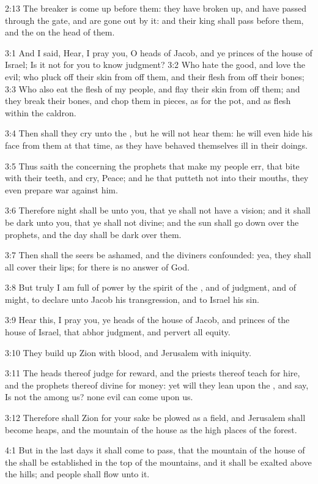 2:13 The breaker is come up before them: they have broken up, and have passed through the gate, and are gone out by it: and their king shall pass before them, and the \LORD on the head of them.

3:1 And I said, Hear, I pray you, O heads of Jacob, and ye princes of the house of Israel; Is it not for you to know judgment?  3:2 Who hate the good, and love the evil; who pluck off their skin from off them, and their flesh from off their bones; 3:3 Who also eat the flesh of my people, and flay their skin from off them; and they break their bones, and chop them in pieces, as for the pot, and as flesh within the caldron.

3:4 Then shall they cry unto the \LORD, but he will not hear them: he will even hide his face from them at that time, as they have behaved themselves ill in their doings.

3:5 Thus saith the \LORD concerning the prophets that make my people err, that bite with their teeth, and cry, Peace; and he that putteth not into their mouths, they even prepare war against him.

3:6 Therefore night shall be unto you, that ye shall not have a vision; and it shall be dark unto you, that ye shall not divine; and the sun shall go down over the prophets, and the day shall be dark over them.

3:7 Then shall the seers be ashamed, and the diviners confounded: yea, they shall all cover their lips; for there is no answer of God.

3:8 But truly I am full of power by the spirit of the \LORD, and of judgment, and of might, to declare unto Jacob his transgression, and to Israel his sin.

3:9 Hear this, I pray you, ye heads of the house of Jacob, and princes of the house of Israel, that abhor judgment, and pervert all equity.

3:10 They build up Zion with blood, and Jerusalem with iniquity.

3:11 The heads thereof judge for reward, and the priests thereof teach for hire, and the prophets thereof divine for money: yet will they lean upon the \LORD, and say, Is not the \LORD among us? none evil can come upon us.

3:12 Therefore shall Zion for your sake be plowed as a field, and Jerusalem shall become heaps, and the mountain of the house as the high places of the forest.

4:1 But in the last days it shall come to pass, that the mountain of the house of the \LORD shall be established in the top of the mountains, and it shall be exalted above the hills; and people shall flow unto it.

